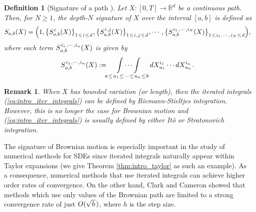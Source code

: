 \documentclass[sn-mathphys-num]{sn-jnl}%
\newtheorem{remark}{Remark}%
\newtheorem{definition}{Definition}%
\newcommand{\R}{\mathbb{R}}
\newcommand{\m}{\hspace{0.25mm}}
\begin{document}
\begin{definition}[Signature of a path {\cite{hambly2010roughpaths, morrill2021nrdes}}]
Let $X:[0,T]\rightarrow \R^d$ be a continuous path. Then, for $N\geq 1$, the depth-$N$ signature of $X$ over the interval $[a,b]$ is defined as
\begin{align*}
S_{a,b}(X) = \Big(1, \big\{S_{a,b}^{\m i}(X)\big\}_{1\m\leq\m i\m\leq\m d}\m, \big\{S_{a,b}^{\m i\m,j}(X)\big\}_{1\m\leq\m i,\m j\m\leq\m d}\m, \cdots, \big\{S_{a,b}^{\m i_1\m,\m\cdots,i_N}(X)\big\}_{1\m\leq\m i_1\m,\m\cdots,\m i_N\m\leq\m d}\Big),
\end{align*}
where each term $\m S_{a,b}^{\m i_1\m,\cdots,i_n}(X)$ is given by
\begin{align}\label{eq:intro_iter_integrals}
S_{a,b}^{\m i_1\m,\cdots,i_n}(X) := \idotsint\displaylimits_{a\m\leq\m u_1\m\leq\m\cdots\m\leq\m u_n\m\leq\m b} dX_{u_1}^{i_1}\cdots dX_{u_n}^{i_n}\m.
\end{align}
\end{definition}
\begin{remark}
When $X$ has bounded variation (or length), then the iterated integrals (\ref{eq:intro_iter_integrals}) can be defined by Riemann-Stieltjes integration. However, this is no longer the case for Brownian motion and (\ref{eq:intro_iter_integrals}) is usually defined by either It\^{o} or Stratonovich integration.
\end{remark}\medbreak

The signature of Brownian motion is especially important in the study of numerical methods for SDEs since iterated integrals naturally appear within Taylor expansions (we give Theorem \ref{thm:intro_taylor} as such an example). As a consequence, numerical methods that use iterated integrals can achieve higher order rates of convergence. On the other hand, Clark and Cameron \cite{clark1980convergence} showed that methods which use only values of the Brownian path are limited to a strong convergence rate of just $O(\sqrt{h}\m)$, where $h$ is the step size.\medbreak
\end{document}
